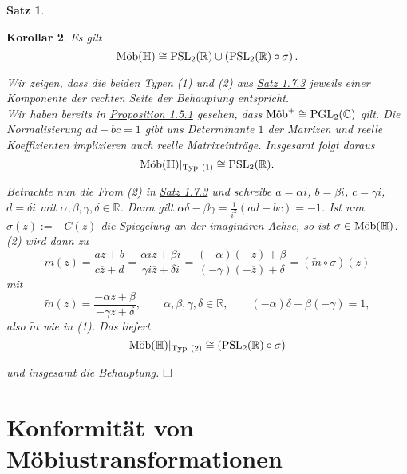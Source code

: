 \documentclass[11pt]{book}
\numberwithin{dummy}{section}
\newtheorem{theorem}{Satz}[section]
\newtheorem{corollary}[theorem]{Korollar}
\theoremstyle{nonumberbreak}
\newenvironment{pr}[1][]{\ifthenelse{\equal{#1}{}}{\proof}{\proof[#1]}\rm}{\endproof}
\newcommand{\C}{\mathbb{C}}
\newcommand{\R}{\mathbb{R}}
\newcommand{\mob}{\textup{Möb}^+}
\newcommand{\amobh}{\textup{Möb}(\mathbb{H})}
\begin{document}
\begin{spacing}{1.4}
\begin{theorem}
\begin{pr}
\end{pr}

\end{theorem}



\hypertarget{korollareinssiebenvier}{}
\begin{corollary}   %
Es gilt
$$\amobh \cong \mathrm{PSL}_2(\R) \cup \left(\mathrm{PSL}_2(\mathbb{R}) \circ \sigma\right).$$

\begin{pr}
Wir zeigen, dass die beiden Typen (1) und (2) aus \hyperlink{satzeinssiebendrei}{Satz 1.7.3} jeweils einer Komponente der rechten Seite der Behauptung entspricht.\\
Wir haben bereits in \hyperlink{propeinsfunfeins}{Proposition 1.5.1} gesehen, dass $\mob \cong \mathrm{PGL}_2(\C)$ gilt. Die Normalisierung $ad-bc=1$ gibt uns Determinante $1$ der Matrizen und reelle Koeffizienten implizieren auch reelle Matrixeinträge. Insgesamt folgt daraus
$$\amobh \vert_{\mathrm{Typ\ (1)}} \cong \mathrm{PSL}_2(\R).$$

Betrachte nun die From (2) in \hyperlink{satzeinssiebendrei}{Satz 1.7.3} und schreibe $a= \alpha i$, $b= \beta i$, $c= \gamma i$, $d = \delta i$ mit $\alpha, \beta, \gamma, \delta \in \R$. Dann gilt $\alpha \delta - \beta \gamma = \frac{1}{i^2} (ad-bc) = -1$. Ist nun $\sigma (z) := -C(z)$ die Spiegelung an der imaginären Achse, so ist $\sigma \in \amobh$. (2) wird dann zu 
$$m(z) = \frac{a\overline{z} + b}{c\overline{z}+d} = \frac{\alpha i \overline{z} +\beta i}{\gamma i \overline{z} + \delta i} = \frac{(-\alpha)(-\overline{z}) + \beta}{(-\gamma)(-\overline{z}) + \delta} = (\tilde{m} \circ \sigma)(z)$$
mit 
$$\tilde{m}(z) = \frac{-\alpha z + \beta}{-\gamma z + \delta}, \qquad \alpha, \beta, \gamma, \delta \in \R, \qquad (-\alpha) \delta - \beta (-\gamma) = 1,$$
also $\tilde{m}$ wie in (1). Das liefert 
$$\amobh \vert_{\mathrm{Typ\ (2)}} \cong \left(\mathrm{PSL}_2(\R) \circ \sigma \right)$$

und insgesamt die Behauptung. $\hfill \Box$


\end{pr}




\end{corollary}



\newpage

\section{Konformität von Möbiustransformationen} %





\end{spacing}
\end{document}
